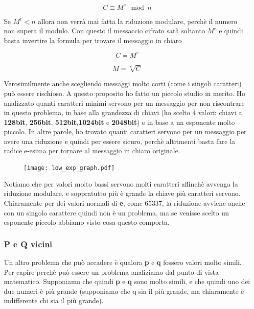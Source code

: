 \documentclass{rapport}
\begin{document}
\begin{equation*}
    C \equiv  M ^ e \mod n 
\end{equation*}

Se $M^e < n$ allora non verrà mai fatta la riduzione modulare, perchè il numero non supera il modulo. Con questo il messaccio cifrato sarà soltanto $M^e$ e quindi basta invertire la formula per trovare il messaggio in chiaro

\begin{equation*}
    C =  M ^ e 
\end{equation*}

\begin{equation*}
   M = \sqrt[e]{C}
\end{equation*}

Verosimilmente anche scegliendo messaggi molto corti (come i singoli caratteri) può essere rischioso. A questo proposito ho fatto un piccolo studio in merito. Ho analizzato quanti caratteri minimi servono per un messaggio per non riscontrare in questo problema, in base alla grandezza di chiavi (ho scelto 4 valori: chiavi a \textbf{128bit}, \textbf{256bit}, \textbf{512bit},\textbf{1024bit} e \textbf{2048bit}) e in base a un esponente molto piccolo. In altre parole, ho trovato quanti caratteri servono per un messaggio per avere una riduzione e quindi per essere sicuro, perchè altrimenti basta fare la radice e-esima per tornare al messaggio in chiaro originale.


\begin{figure}[h]
    \centering
    \texttt{[image: low\_exp\_graph.pdf]}
\end{figure}

Notiamo che per valori molto bassi servono molti caratteri affinchè avvenga la riduzione modulare, e soppratutto più è grande la chiave più caratteri servono. Chiaramente per dei valori normali di \textbf{e}, come 65337, la riduzione avviene anche con un singolo carattere quindi non è un problema, ma se venisse scelto un esponente piccolo abbiamo visto cosa questo comporta.

\subsubsection{P e Q vicini}
Un altro problema che può accadere è qualora \textbf{p} e \textbf{q} fossero valori molto simili. Per capire perchè può essere un problema analiziamo dal punto di vista matematico. Supponiamo che quindi \textbf{p} e \textbf{q} sono molto simili, e che quindi uno dei due numeri è più grande (supponiamo che q sia il più grande, ma chiaramente è indifferente chi sia il più grande).
\end{document}
